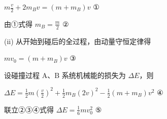 \documentclass[\gkver]{gaokaozhenti}
\begin{document}
\begin{enumerate}
{$m\frac{v}{2}+2m_{B}v=(m+m_{B})v$ ①

由①式得 $m_{B}=\frac{m}{2}$ ②

(ii) 从开始到碰后的全过程，由动量守恒定律得

$mv_{0}=(m+m_{B})v$ ③

设碰撞过程 A、B 系统机械能的损失为 $\Delta E$，则

$\Delta E=\frac{1}{2}m\left(\frac{v}{2}\right)^{2}+\frac{1}{2}m_{B}(2v)^{2}-\frac{1}{2}(m+m_{B})v^{2}$ ④

联立②③④式得 $\Delta E=\frac{1}{6}mv_{0}^{2}$ ⑤
}

\end{enumerate}
\end{document}
